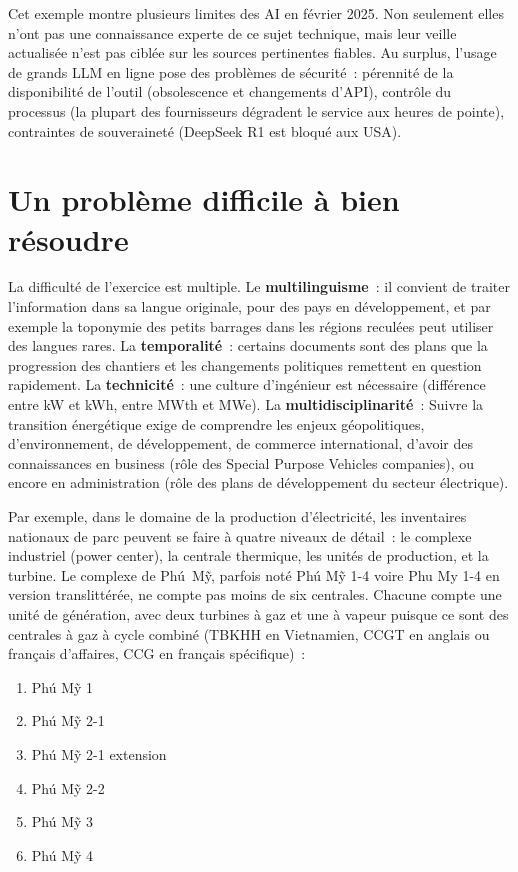 \documentclass[a4paper,11pt]{report}
\begin{document}
Cet exemple montre plusieurs limites des AI en février 2025. Non seulement elles n'ont pas une connaissance experte de ce sujet technique, mais leur veille actualisée n'est pas ciblée sur les sources pertinentes fiables. Au surplus, l'usage de grands LLM en ligne pose des problèmes de sécurité~: pérennité de la disponibilité de l'outil (obsolescence et changements d'API), contrôle du processus (la plupart des fournisseurs dégradent le service aux heures de pointe), contraintes de souveraineté (DeepSeek R1 est bloqué aux USA).

\section{Un problème difficile à bien résoudre}

La difficulté de l'exercice est multiple. Le \textbf{multilinguisme}~: il convient de traiter l'information dans sa langue originale, pour des pays en développement, et par exemple la toponymie des petits barrages dans les régions reculées peut utiliser des langues rares. La \textbf{temporalité}~: certains documents sont des plans que la progression des chantiers et les changements politiques remettent en question rapidement. La \textbf{technicité}~: une culture d'ingénieur est nécessaire (différence entre kW et kWh, entre MWth et MWe). La \textbf{multidisciplinarité}~: Suivre la transition énergétique exige de comprendre les enjeux géopolitiques, d'environnement, de développement, de commerce international, d'avoir des connaissances en business (rôle des Special Purpose Vehicles companies), ou encore en administration (rôle des plans de développement du secteur électrique).

Par exemple, dans le domaine de la production d'électricité, les inventaires nationaux de parc peuvent se faire à quatre niveaux de détail~: le complexe industriel (power center), la centrale thermique, les unités de production, et la turbine. Le complexe de Phú~Mỹ, parfois noté Phú Mỹ 1-4 voire Phu My 1-4 en version translittérée, ne compte pas moins de six centrales. Chacune compte une unité de génération, avec deux turbines à gaz et une à vapeur puisque ce sont des centrales à gaz à cycle combiné (TBKHH en Vietnamien, CCGT en anglais ou français d'affaires, CCG en français spécifique)~:

\begin{enumerate}
\item Phú Mỹ 1
\item Phú Mỹ 2-1
\item Phú Mỹ 2-1 extension
\item Phú Mỹ 2-2
\item Phú Mỹ 3
\item Phú Mỹ 4
\end{enumerate}
\end{document}
